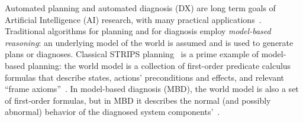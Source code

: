 \documentclass[12pt]{article}
\begin{document}








Automated planning and automated diagnosis (DX) are long term goals of Artificial Intelligence (AI) research, with many practical applications~\cite{williams96,niggemann10model,abreu2011simultaneousDebugging,Zamir2014UsingMD,abreu2011simultaneousDebugging}. Traditional algorithms for planning and for diagnosis employ {\em model-based reasoning}: an underlying model of the world is assumed and is used to generate plans or diagnoses. Classical STRIPS planning~\cite{fikes1971strips} is a prime example of model-based planning: the world model is a collection of first-order predicate calculus formulas that describe states, actions' preconditions and effects, and relevant ``frame axioms''~\cite{ghallab2004automated}. In model-based diagnosis (MBD), the world model is also a set of first-order formulas, but in MBD it describes the normal (and possibly abnormal) behavior of the diagnosed system components'~\cite{reiter1987theory,deKleer1987diagnosing}. 
\end{document}
